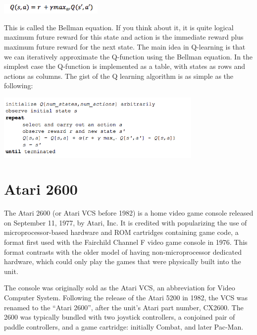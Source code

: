\documentclass[twoside,letterpaper]{article}
\begin{document}
{{\begin{centering}
\includegraphics[width=5cm]{images/q3.png}\\
\end{centering}

\flushleft
This is called the Bellman equation. If you think about it, it is quite logical maximum future reward for this state and action is the immediate reward plus maximum future reward for the next state.
The main idea in Q-learning is that we can iteratively approximate the Q-function using the Bellman equation. In the simplest case the Q-function is implemented as a table, with states as rows and actions as columns. The gist of the Q learning algorithm is as simple as the following:

\begin{centering}
\includegraphics[width=10cm]{images/q4.png}\\
\end{centering}

}
\section{Atari 2600}
The Atari 2600 (or Atari VCS before 1982) is a home video game console released on September 11, 1977, by Atari, Inc. It is credited with popularizing the use of microprocessor-based hardware and ROM cartridges containing game code, a format first used with the Fairchild Channel F video game console in 1976. This format contrasts with the older model of having non-microprocessor dedicated hardware, which could only play the games that were physically built into the unit.

The console was originally sold as the Atari VCS, an abbreviation for Video Computer System. Following the release of the Atari 5200 in 1982, the VCS was renamed to the ``Atari 2600'', after the unit's Atari part number, CX2600. The 2600 was typically bundled with two joystick controllers, a conjoined pair of paddle controllers, and a game cartridge: initially Combat, and later Pac-Man.

}
\end{document}
